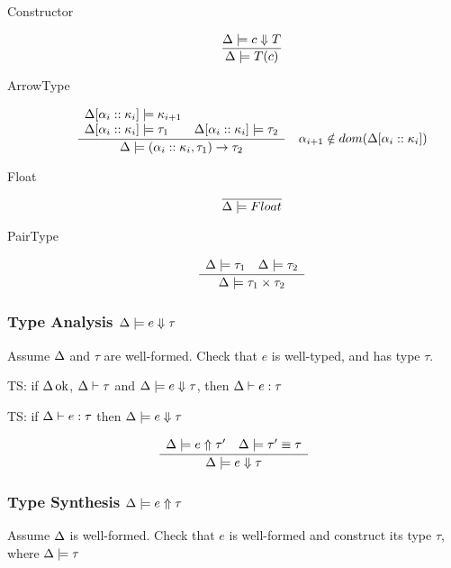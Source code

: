 \documentclass[12pt,twoside,fleqn]{amsart}
\theoremstyle{plain}
\theoremstyle{plain}
\theoremstyle{definition}
\begin{document}
\begin{description}
\item [Constructor]
\[
\frac{\Delta  \models c \Downarrow T}{\Delta  \models T(c) }\]

\item [ArrowType]
\[
\frac{\begin{array}{ll}
\Delta  [\alpha _{i}  ::\kappa _{i}  ] \models \kappa _{i+1} & \\
\Delta  [\alpha _{i}  ::\kappa _{i}  ] \models \tau _{1} & \Delta  [\alpha _{i}  ::\kappa _{i}  ] \models \tau _{2}
\end{array}}{\Delta  \models (\alpha _{i}::\kappa _{i},\tau _{1})\rightarrow \tau _{2} }\quad \alpha _{i+1}\notin dom(\Delta [\alpha _{i}::\kappa _{i}])\]

\item [Float]
\[
\overline{\Delta  \models Float  }\]

\item [PairType]
\[
\frac{\begin{array}{ll}
\Delta  \models \tau _{1}  & \Delta  \models \tau _{2} 
\end{array}}{\Delta  \models \tau _{1}\times \tau _{2} }\]

\end{description}

\subsubsection{Type Analysis \protect\( \Delta  \models e \Downarrow \tau \protect \)}

Assume \( \Delta  \) and \( \tau  \) are well-formed. Check that \( e \)
is well-typed, and has type \( \tau  \).

TS: if \( \Delta  \, \mathrm{ok} \), \( \Delta  \vdash \tau   \) and \( \Delta  \models e \Downarrow \tau  \),
then \( \Delta  \vdash e  :\tau   \)

TS: if \( \Delta  \vdash e  :\tau   \) then \( \Delta  \models e \Downarrow \tau  \)


\[
\frac{\begin{array}{ll}
\Delta  \models e  \Uparrow \tau '  & \Delta  \models \tau '  \equiv \tau  
\end{array} }{\Delta  \models e \Downarrow \tau  }\]



\subsubsection{Type Synthesis \protect\( \Delta  \models e  \Uparrow \tau  \protect \)}

Assume \( \Delta  \) is well-formed. Check that \( e \) is well-formed and
construct its type \( \tau  \), where \( \Delta  \models \tau   \)
\end{document}
